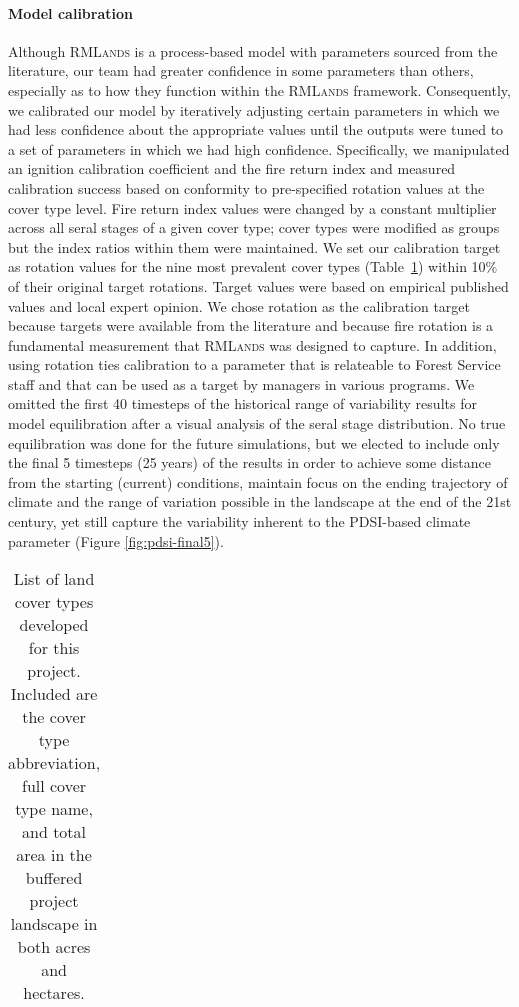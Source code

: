 \documentclass[12pt]{article}
\begin{document}
\begin{spacing}{1}
\paragraph{Model calibration}
Although \textsc{RMLands} is a process-based model with parameters sourced from the literature, our team had greater confidence in some parameters than others, especially as to how they function within the \textsc{RMLands} framework. Consequently, we calibrated our model by iteratively adjusting certain parameters in which we had less confidence about the appropriate values until the outputs were tuned to a set of parameters in which we had high confidence. Specifically, we manipulated an ignition calibration coefficient and the fire return index and measured calibration success based on conformity to pre-specified rotation values at the cover type level. Fire return index values were changed by a constant multiplier across all seral stages of a given cover type; cover types were modified as groups but the index ratios within them were maintained. We set our calibration target as rotation values for the nine most prevalent cover types (Table~\ref{tab:covertable}) within 10\% of their original target rotations. Target values were based on empirical published values and local expert opinion. We chose rotation as the calibration target because targets were available from the literature and because fire rotation is a fundamental measurement that \textsc{RMLands} was designed to capture. In addition, using rotation ties calibration to a parameter that is relateable to Forest Service staff and that can be used as a target by managers in various programs. We omitted the first 40 timesteps of the historical range of variability results for model equilibration after a visual analysis of the seral stage distribution. No true equilibration was done for the future simulations, but we elected to include only the final 5 timesteps (25 years) of the results in order to achieve some distance from the starting (current) conditions, maintain focus on the ending trajectory of climate and the range of variation possible in the landscape at the end of the 21st century, yet still capture the variability inherent to the PDSI-based climate parameter (Figure \ref{fig:pdsi-final5}).


\begin{table}[!htbp]
\small
\centering
\caption{List of land cover types developed for this project. Included are the cover type abbreviation, full cover type name, and total area in the buffered project landscape in both acres and hectares.}
\label{tab:covertable}
\begin{tabular}{@{}lll@{}}


\end{tabular}
\end{table}
\end{spacing}
\end{document}
